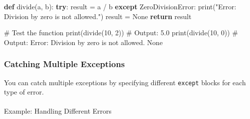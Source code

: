 \documentclass[
  letterpaper,
  DIV=11,
  numbers=noendperiod]{scrreprt}
\makeatletter
\let\oldparagraph\paragraph
\renewcommand{\paragraph}{
    \@ifstar
      \xxxParagraphStar
      \xxxParagraphNoStar
  }
\newcommand{\xxxParagraphStar}[1]{\oldparagraph*{#1}\mbox{}}
\newcommand{\xxxParagraphNoStar}[1]{\oldparagraph{#1}\mbox{}}
\newenvironment{Shaded}{\begin{snugshade}}{\end{snugshade}}
\newcommand{\BuiltInTok}[1]{\textcolor[rgb]{0.00,0.23,0.31}{#1}}
\newcommand{\CommentTok}[1]{\textcolor[rgb]{0.37,0.37,0.37}{#1}}
\newcommand{\ControlFlowTok}[1]{\textcolor[rgb]{0.00,0.23,0.31}{\textbf{#1}}}
\newcommand{\DecValTok}[1]{\textcolor[rgb]{0.68,0.00,0.00}{#1}}
\newcommand{\KeywordTok}[1]{\textcolor[rgb]{0.00,0.23,0.31}{\textbf{#1}}}
\newcommand{\NormalTok}[1]{\textcolor[rgb]{0.00,0.23,0.31}{#1}}
\newcommand{\OperatorTok}[1]{\textcolor[rgb]{0.37,0.37,0.37}{#1}}
\newcommand{\PreprocessorTok}[1]{\textcolor[rgb]{0.68,0.00,0.00}{#1}}
\newcommand{\StringTok}[1]{\textcolor[rgb]{0.13,0.47,0.30}{#1}}
\newcommand{\VariableTok}[1]{\textcolor[rgb]{0.07,0.07,0.07}{#1}}
\makeatother
\begin{document}
\begin{Shaded}
\begin{Highlighting}[]
\KeywordTok{def}\NormalTok{ divide(a, b):}
    \ControlFlowTok{try}\NormalTok{:}
\NormalTok{        result }\OperatorTok{=}\NormalTok{ a }\OperatorTok{/}\NormalTok{ b}
    \ControlFlowTok{except} \PreprocessorTok{ZeroDivisionError}\NormalTok{:}
        \BuiltInTok{print}\NormalTok{(}\StringTok{"Error: Division by zero is not allowed."}\NormalTok{)}
\NormalTok{        result }\OperatorTok{=} \VariableTok{None}
    \ControlFlowTok{return}\NormalTok{ result}

\CommentTok{\# Test the function}
\BuiltInTok{print}\NormalTok{(divide(}\DecValTok{10}\NormalTok{, }\DecValTok{2}\NormalTok{))  }\CommentTok{\# Output: 5.0}
\BuiltInTok{print}\NormalTok{(divide(}\DecValTok{10}\NormalTok{, }\DecValTok{0}\NormalTok{))  }\CommentTok{\# Output: Error: Division by zero is not allowed. None}
\end{Highlighting}
\end{Shaded}

\subsubsection{Catching Multiple
Exceptions}\label{catching-multiple-exceptions}

You can catch multiple exceptions by specifying different
\texttt{except} blocks for each type of error.

\paragraph{Example: Handling Different
Errors}\label{example-handling-different-errors}
\end{document}
